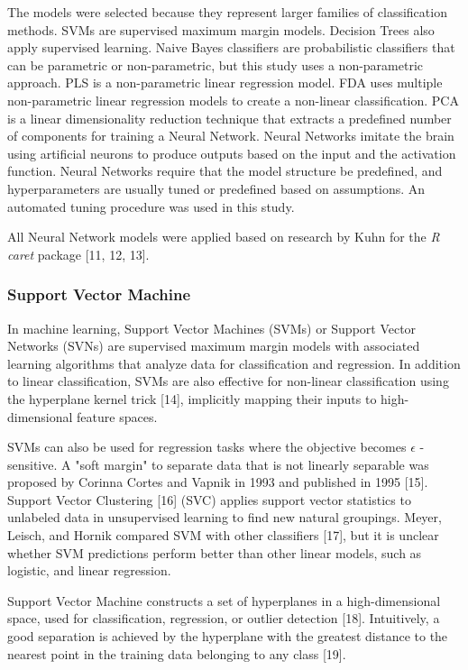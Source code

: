 \documentclass[sn-mathphys-num]{sn-jnl}%
\begin{document}
The models were selected because they represent larger families of classification methods. SVMs are supervised maximum margin models. Decision Trees also apply supervised learning. Naive Bayes classifiers are probabilistic classifiers that can be parametric or non-parametric, but this study uses a non-parametric approach. PLS is a non-parametric linear regression model. FDA uses multiple non-parametric linear regression models to create a non-linear classification. PCA is a linear dimensionality reduction technique that extracts a predefined number of components for training a Neural Network. Neural Networks imitate the brain using artificial neurons to produce outputs based on the input and the activation function. Neural Networks require that the model structure be predefined, and hyperparameters are usually tuned or predefined based on assumptions. An automated tuning procedure was used in this study.

All Neural Network models were applied based on research by Kuhn for the \textit{R} \textit{caret} package [11, 12, 13].

\subsubsection{Support Vector Machine}

In machine learning, Support Vector Machines (SVMs) or Support Vector Networks (SVNs) are supervised maximum margin models with associated learning algorithms that analyze data for classification and regression. In addition to linear classification, SVMs are also effective for non-linear classification using the hyperplane kernel trick [14], implicitly mapping their inputs to high-dimensional feature spaces.

SVMs can also be used for regression tasks where the objective becomes $\epsilon$ -sensitive. A "soft margin" to separate data that is not linearly separable was proposed by Corinna Cortes and Vapnik in 1993 and published in 1995 [15]. Support Vector Clustering [16] (SVC) applies support vector statistics to unlabeled data in unsupervised learning to find new natural groupings. Meyer, Leisch, and Hornik compared SVM with other classifiers [17], but it is unclear whether SVM predictions perform better than other linear models, such as logistic, and linear regression.

Support Vector Machine constructs a set of hyperplanes in a high-dimensional space, used for classification, regression, or outlier detection [18]. Intuitively, a good separation is achieved by the hyperplane with the greatest distance to the nearest point in the training data belonging to any class [19].
\end{document}
